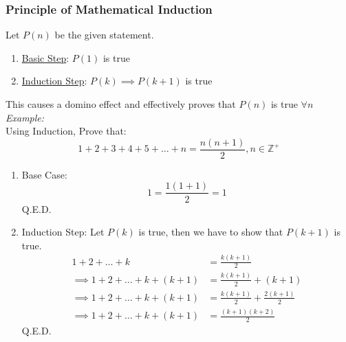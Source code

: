 \documentclass[11pt,letterpaper]{article}
\newenvironment{example}                             
        {\textit{Example:}\\}
	{}
\begin{document}
\subsubsection{Principle of Mathematical Induction}
Let $P(n)$ be the given statement.
\begin{enumerate}
  \item \underline{Basic Step}: $P(1)$ is true
\item \underline{Induction Step}: $P(k) \implies P(k+1)$ is true
\end{enumerate}
This causes a domino effect and effectively proves that $P(n)$ is true $\forall n$
\begin{example}
  Using Induction, Prove that:
  \[
    1 + 2 + 3 + 4 + 5 + \dots + n = \frac{n(n+1)}{2}, n \in \mathbb{Z}^+
  \]
  \begin{enumerate}
    \item Base Case: \\ 
      \[
        1 = \frac{1(1+1)}{2} = 1
      \]
      \hfill Q.E.D.
    \item Induction Step:
      Let $P(k)$ is true, then we have to show that   $P(k+1)$ is true.
      \begin{align*}
        1+2+ \dots + k &= \frac{k(k+1)}{2} \\
        \implies 1+2+ \dots + k + (k+1) &= \frac{k(k+1)}{2} + (k+1) \\
        \implies 1+2+ \dots + k + (k+1) &= \frac{k(k+1)}{2} + \frac{2(k+1)}{2} \\
        \implies 1+2+ \dots + k + (k+1) &= \frac{(k+1)(k+2)}{2}
      \end{align*}
      \hfill Q.E.D.
  \end{enumerate}
\end{example}
\end{document}
